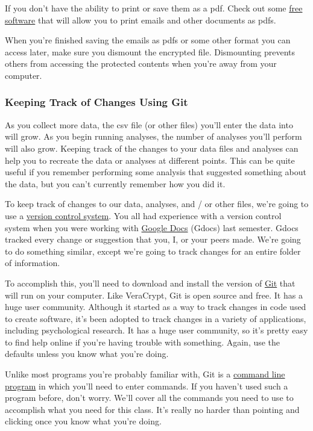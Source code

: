 \documentclass[12pt]{article}
\begin{document}
If you don't have the ability to print or save them as a pdf. Check out some
\href{http://www.cutepdf.com/products/cutepdf/writer.asp}{free software} that will allow
you to print emails and other documents as pdfs.

When you're finished saving the emails as pdfs or some other format you can access later,
make sure you dismount the encrypted file. Dismounting prevents others from accessing the
protected contents when you're away from your computer.

\subsubsection{Keeping Track of Changes Using Git}
As you collect more data, the csv file (or other files) you'll enter the data into will
grow. As you begin running analyses, the number of analyses you'll perform will also grow.
Keeping track of the changes to your data files and analyses can help you to recreate
the data or analyses at different points. This can be quite useful if you remember performing
some analysis that suggested something about the data, but you can't currently remember how
you did it.

To keep track of changes to our data, analyses, and / or other files, we're going to use a
\href{http://en.wikipedia.org/wiki/Revision_control}{version control system}. You all had
experience with a version control system when you were working with
\href{https://docs.google.com}{Google Docs} (Gdocs) last semester. Gdocs tracked every change
or suggestion that you, I, or your peers made. We're going to do something similar, except
we're going to track changes for an entire folder of information.

To accomplish this, you'll need to download and install the version of
\href{http://git-scm.com/downloads}{Git} that will run on
your computer. Like VeraCrypt, Git is open source and free. It has a huge user community.
Although it started as a way to track changes in code used to create software, it's been
adopted to track changes in a variety of applications, including psychological research. It
has a huge user community, so it's pretty easy to find help online if you're having trouble
with something. Again, use the defaults unless you know what you're doing.

Unlike most programs you're probably familiar with, Git is a
\href{http://en.wikipedia.org/wiki/Command-line_interface}
{command line program} in which you'll need to enter commands. If you haven't used such
a program before, don't worry. We'll cover all the commands you need to use to accomplish
what you need for this class. It's really no harder than pointing and clicking once you
know what you're doing.
\end{document}
